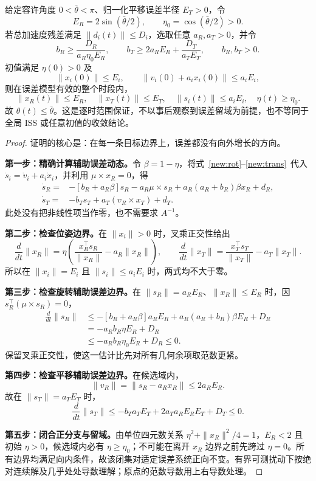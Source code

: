 \begin{theorem}[原反馈律的扰动幅值到位姿范围设计]\label{new:peak}
给定容许角度 $0<\bar\theta<\pi$、归一化平移误差半径 $E_T>0$，令
\[
E_R=2\sin(\bar\theta/2),\qquad
\eta_0=\cos(\bar\theta/2)>0.
\]
若总加速度残差满足 $\|d_i(t)\|\le D_i$，选取任意 $a_R,a_T>0$，并令
\begin{equation}
\boxed{b_R\ge\frac{D_R}{a_R\eta_0E_R},\qquad
b_T\ge2a_RE_R+\frac{D_T}{a_TE_T},\qquad b_R,b_T>0.}
\label{new:peak-design}
\end{equation}
初值满足 $\eta(0)>0$ 及
\[
\|x_i(0)\|\le E_i,\qquad
\|v_i(0)+a_i x_i(0)\|\le a_iE_i,
\]
则在误差模型有效的整个时段内，
\begin{equation}
\boxed{\|x_R(t)\|\le E_R,\quad
\|x_T(t)\|\le E_T,\quad
\|s_i(t)\|\le a_iE_i,\quad
\eta(t)\ge\eta_0.}
\label{new:peak-bound}
\end{equation}
故 $\theta(t)\le\bar\theta$。这是逐时范围保证，不以事后观察到误差留域为前提，也不等同于全局 ISS 或任意初值的收敛结论。
\end{theorem}

\begin{proof}
证明的核心是：在每一条目标边界上，误差都没有向外增长的方向。

\textbf{第一步：精确计算辅助误差动态。}令 $\beta=1-\eta$，将式~\eqref{new:rot}--\eqref{new:trans}~代入 $\dot s_i=\dot v_i+a_i\dot x_i$，并利用 $\mu\times x_R=0$，得
\begin{align}
\dot s_R={}&-[b_R+a_R\beta]s_R-a_R\mu\times s_R
+a_R(a_R+b_R)\beta x_R+d_R,\label{new:sR}\\
\dot s_T={}&-b_Ts_T+a_T(v_R\times x_T)+d_T.\label{new:sT}
\end{align}
此处没有把非线性项当作零，也不需要求 $A^{-1}$。

\textbf{第二步：检查位姿边界。}在 $\|x_i\|>0$ 时，叉乘正交性给出
\[
\frac{d}{dt}\|x_R\|
=\eta\left(\frac{x_R^\top s_R}{\|x_R\|}-a_R\|x_R\|\right),
\qquad
\frac{d}{dt}\|x_T\|
=\frac{x_T^\top s_T}{\|x_T\|}-a_T\|x_T\|.
\]
所以在 $\|x_i\|=E_i$ 且 $\|s_i\|\le a_iE_i$ 时，两式均不大于零。

\textbf{第三步：检查旋转辅助误差边界。}在 $\|s_R\|=a_RE_R$、$\|x_R\|\le E_R$ 时，因 $s_R^\top(\mu\times s_R)=0$，
\begin{align*}
\frac{d}{dt}\|s_R\|
&\le-[b_R+a_R\beta]a_RE_R
+a_R(a_R+b_R)\beta E_R+D_R\\
&=-a_Rb_R\eta E_R+D_R\\
&\le-a_Rb_R\eta_0E_R+D_R\le0.
\end{align*}
保留叉乘正交性，使这一估计比先对所有几何余项取范数更紧。

\textbf{第四步：检查平移辅助误差边界。}在候选域内，
\[
\|v_R\|=\|s_R-a_Rx_R\|\le2a_RE_R.
\]
故在 $\|s_T\|=a_TE_T$ 时，
\[
\frac{d}{dt}\|s_T\|
\le-b_Ta_TE_T+2a_Ta_RE_RE_T+D_T\le0.
\]

\textbf{第五步：闭合正分支与留域。}由单位四元数关系 $\eta^2+\|x_R\|^2/4=1$，$E_R<2$ 且初始 $\eta>0$，候选域内必有 $\eta\ge\eta_0$；不可能在离开 $x_R$ 边界之前先跨过 $\eta=0$。所有边界均满足向内条件，故该闭集对适定误差系统正向不变。有界可测扰动下按绝对连续解及几乎处处导数理解；原点的范数导数用上右导数处理。
\end{proof}

